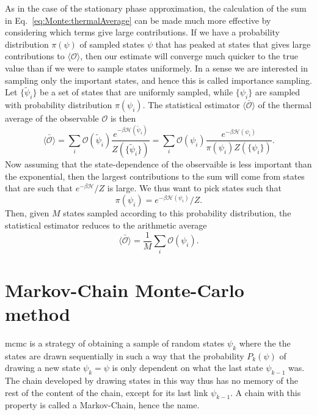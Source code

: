 As in the case of the stationary phase approximation, the calculation of the sum in Eq.~\eqref{eq:Monte:thermalAverage} can be made much more effective
by considering which terms give large contributions. If we have a probability distribution $\pi(\psi)$ of sampled states $\psi$ that has peaked at states
that gives large contributions to $\langle\mathcal{O}\rangle$, then our estimate will converge much quicker to the true value than if we were to
sample states uniformely. In a sense we are interested in sampling only the important states, and hence this is called importance sampling. Let
$\{\tilde{\psi}_i\}$ be a set of states that are uniformly sampled, while $\{\psi_i\}$ are sampled with probability distribution $\pi(\psi_i)$. The
statistical estimator $\bar{\langle\mathcal{O}\rangle}$ of the thermal average of the observable $\mathcal{O}$ is then
\begin{equation}
    \label{eq:Monte:importanceSampledThermAvg}
    \bar{\langle\mathcal{O}\rangle} = \sum_{i}\mathcal{O}(\tilde{\psi}_i)\frac{e^{-\beta\mathcal{H}(\tilde{\psi}_i)}}{Z(\{\tilde{\psi}_i\})} = \sum_{i}\mathcal{O}(\psi_i)\frac{e^{-\beta\mathcal{H}(\psi_i)}}{\pi(\psi_i)Z(\{\psi_i\})}.
\end{equation}
Now assuming that the state-dependence of the observaible is less important than the exponential, then the largest contributions to the sum will
come from states that are such that $e^{-\beta\mathcal{H}}/Z$ is large. We thus want to pick states such that 
\begin{equation}
    \label{eq:Monte:boltzmannDist}
    \pi(\psi_i) = e^{-\beta\mathcal{H}(\psi_i)}/Z.
\end{equation}
Then, given $M$ states sampled according to this probability distribution, the statistical estimator reduces to the arithmetic average
\begin{equation}
    \label{eq:Monte:arithmTherm:Avg}
    \bar{\langle\mathcal{O}\rangle} = \frac{1}{M}\sum_i\mathcal{O}(\psi_i).
\end{equation}

\section{Markov-Chain Monte-Carlo method}

\ac{mcmc} is a strategy of obtaining a sample of random states $\psi_k$ where the the states are drawn sequentially in such
a way that the probability $P_k(\psi)$ of drawing a new state $\psi_k=\psi$ is only dependent on what the last
state $\psi_{k-1}$ was. The chain developed by drawing states in this way thus has no memory of the rest of the content
of the chain, except for its last link $\psi_{k-1}$. A chain with this property is called a Markov-Chain, hence the name.

